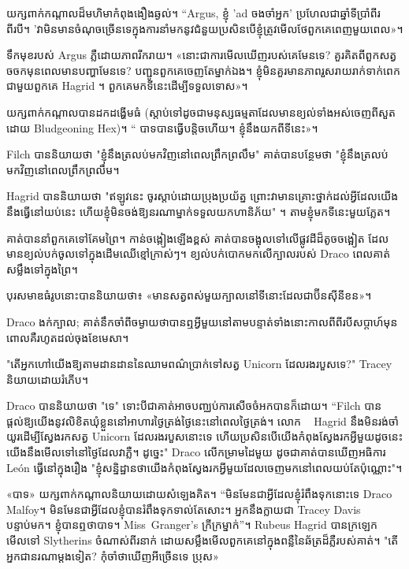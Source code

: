 យក្សពាក់កណ្តាលដ៏មហិមាកំពុងងឿងឆ្ងល់។ “Argus, ខ្ញុំ 'ad ចងចាំអ្នក' ប្រហែលជាឆ្នាំទីប្រាំពីរពីរបី។ 'វា​មិន​មាន​ចំណុច​ច្រើន​ទេ​ក្នុង​ការ​នាំ​មក​នូវ​ជំនួយ​ប្រសិនបើ​ខ្ញុំ​ត្រូវ​មើល​ថែ​ពួកគេ​ពេញ​មួយ​ពេល»។

ទឹកមុខរបស់ Argus ភ្លឺដោយភាពរីករាយ។ «នោះ​ជា​ការ​មើល​ឃើញ​របស់​គេ​មែន​ទេ? គួរ​គិត​ពី​ពួក​សត្វ​ចចក​មុន​ពេល​មាន​បញ្ហា​មែន​ទេ? បញ្ជូនពួកគេចេញតែម្នាក់ឯង។ ខ្ញុំមិនគួរមានភាពរួសរាយរាក់ទាក់ពេកជាមួយពួកគេ Hagrid ។ ពួក​គេ​មក​ទី​នេះ​ដើម្បី​ទទួល​ទោស»។

យក្សពាក់កណ្តាលបានដកដង្ហើមធំ (ស្តាប់ទៅដូចជាមនុស្សធម្មតាដែលមានខ្យល់ទាំងអស់ចេញពីសួតដោយ Bludgeoning Hex)។ “ បាទបានធ្វើបន្តិចហើយ។ ខ្ញុំ​នឹង​យក​ពី​ទីនេះ»។

Filch បាននិយាយថា "ខ្ញុំនឹងត្រលប់មកវិញនៅពេលព្រឹកព្រលឹម" គាត់បានបន្ថែមថា "ខ្ញុំនឹងត្រលប់មកវិញនៅពេលព្រឹកព្រលឹម។

Hagrid បាននិយាយថា "ឥឡូវនេះ ចូរស្តាប់ដោយប្រុងប្រយ័ត្ន ព្រោះវាមានគ្រោះថ្នាក់ដល់អ្វីដែលយើងនឹងធ្វើនៅយប់នេះ ហើយខ្ញុំមិនចង់ឱ្យនរណាម្នាក់ទទួលយកហានិភ័យ" ។ តាមខ្ញុំមកទីនេះមួយភ្លែត។

គាត់បាននាំពួកគេទៅគែមព្រៃ។ កាន់​ចង្កៀង​ឡើង​ខ្ពស់ គាត់​បាន​ចង្អុល​ទៅ​លើ​ផ្លូវ​ដី​ដ៏​តូច​ចង្អៀត ដែល​មាន​ខ្យល់​បក់​ចូល​ទៅ​ក្នុង​ដើមឈើ​ខ្មៅ​ក្រាស់ៗ។ ខ្យល់​បក់​បោក​មក​លើ​ក្បាល​របស់ Draco ពេល​គាត់​សម្លឹង​ទៅ​ក្នុង​ព្រៃ។

បុរស​មាឌធំ​រូប​នោះ​បាន​និយាយ​ថា​៖ «​មាន​សត្វ​ពស់​មួយ​ក្បាល​នៅ​ទីនោះ​ដែល​ជា​ប៊ីន​ស៊ី​នី​ខន​»​។

Draco ងក់ក្បាល; គាត់នឹកចាំពីចម្ងាយថាបានឮអ្វីមួយនៅតាមបន្ទាត់ទាំងនោះកាលពីពីរបីសប្តាហ៍មុន ពោលគឺរហូតដល់ចុងខែមេសា។

"តើអ្នកហៅយើងឱ្យតាមដានដាននៃឈាមពណ៌ប្រាក់ទៅសត្វ Unicorn ដែលរងរបួសទេ?" Tracey និយាយដោយរំភើប។

Draco បាននិយាយថា "ទេ" ទោះបីជាគាត់អាចបញ្ឈប់ការសើចចំអកបានក៏ដោយ។ “Filch បានផ្តល់ឱ្យយើងនូវលិខិតឃុំខ្លួននៅអាហារថ្ងៃត្រង់ថ្ងៃនេះនៅពេលថ្ងៃត្រង់។ លោក ~ Hagrid នឹងមិនរង់ចាំយូរដើម្បីស្វែងរកសត្វ Unicorn ដែលរងរបួសនោះទេ ហើយប្រសិនបើយើងកំពុងស្វែងរកអ្វីមួយដូចនេះ យើងនឹងមើលទៅនៅថ្ងៃដែលវាភ្លឺ។ ដូច្នេះ" Draco លើកម្រាមដៃមួយ ដូចជាគាត់បានឃើញអធិការ León ធ្វើនៅក្នុងរឿង "ខ្ញុំសន្និដ្ឋានថាយើងកំពុងស្វែងរកអ្វីមួយដែលចេញមកនៅពេលយប់តែប៉ុណ្ណោះ"។

«បាទ» យក្សពាក់កណ្តាលនិយាយដោយសំឡេងគិត។ “មិនមែនជាអ្វីដែលខ្ញុំរំពឹងទុកនោះទេ Draco Malfoy។ មិនមែនជាអ្វីដែលខ្ញុំបានរំពឹងទុកទាល់តែសោះ។ អ្នកនឹងក្លាយជា Tracey Davis បន្ទាប់មក។ ខ្ញុំ​បាន​ឮ​ថា​បាទ។ Miss~Granger's ក្រីក្រម្នាក់”។ Rubeus Hagrid បានក្រឡេកមើលទៅ Slytherins ចំណាស់ពីរនាក់ ដោយសម្លឹងមើលពួកគេនៅក្នុងពន្លឺនៃឆ័ត្រដ៏ភ្លឺរបស់គាត់។ "តើអ្នកជានរណាម្តងទៀត? កុំចាំថាឃើញអីច្រើនទេ ប្រុស»

